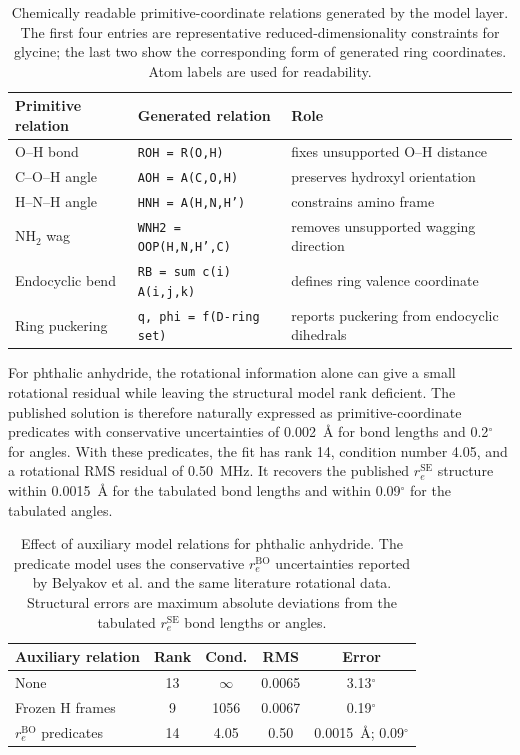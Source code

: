 \documentclass[aip,jcp,reprint,longbibliography,floatfix]{revtex4-2}
\begin{document}
\begin{table}[t]
\caption{Chemically readable primitive-coordinate relations generated by the
model layer. The first four entries are representative reduced-dimensionality
constraints for glycine; the last two show the corresponding form of generated
ring coordinates. Atom labels are used for readability.}
\label{tab:generated-relation-example}
\scriptsize
\setlength{\tabcolsep}{4pt}
\begin{tabular}{@{}lll@{}}
\toprule
Primitive relation & Generated relation & Role \\
\midrule
O--H bond & \texttt{ROH = R(O,H)} & fixes unsupported O--H distance \\
C--O--H angle & \texttt{AOH = A(C,O,H)} & preserves hydroxyl orientation \\
H--N--H angle & \texttt{HNH = A(H,N,H')} & constrains amino frame \\
NH$_2$ wag & \texttt{WNH2 = OOP(H,N,H',C)} & removes unsupported wagging direction \\
Endocyclic bend & \texttt{RB = sum c(i) A(i,j,k)} & defines ring valence coordinate \\
Ring puckering & \texttt{q, phi = f(D-ring set)} & reports puckering from endocyclic dihedrals \\
\bottomrule
\end{tabular}
\end{table}

For phthalic anhydride, the rotational information alone can give a small
rotational residual while leaving the structural model rank deficient. The
published solution is therefore naturally expressed as primitive-coordinate
predicates with conservative uncertainties of 0.002~\AA{} for bond lengths and
0.2$^\circ$ for angles. With these predicates, the fit has
rank 14, condition number 4.05, and a rotational RMS residual of 0.50~MHz. It
recovers the published $r_e^\mathrm{SE}$ structure within 0.0015~\AA{} for the
tabulated bond lengths and within 0.09$^\circ$ for the tabulated angles.

\begin{table}[t]
\caption{Effect of auxiliary model relations for phthalic anhydride. The
predicate model uses the conservative $r_e^\mathrm{BO}$ uncertainties reported
by Belyakov et al. and the same literature rotational data. Structural errors are
maximum absolute deviations from the tabulated $r_e^\mathrm{SE}$ bond lengths or angles.}
\label{tab:phthalic-predicates}
\scriptsize
\setlength{\tabcolsep}{2.5pt}
\begin{tabular}{lcccc}
\toprule
Auxiliary relation & Rank & Cond. & RMS & Error \\
\midrule
None & 13 & $\infty$ & 0.0065 & 3.13$^\circ$ \\
Frozen H frames & 9 & 1056 & 0.0067 & 0.19$^\circ$ \\
$r_e^\mathrm{BO}$ predicates & 14 & 4.05 & 0.50 & 0.0015~\AA; 0.09$^\circ$ \\
\bottomrule
\end{tabular}
\end{table}
\end{document}
